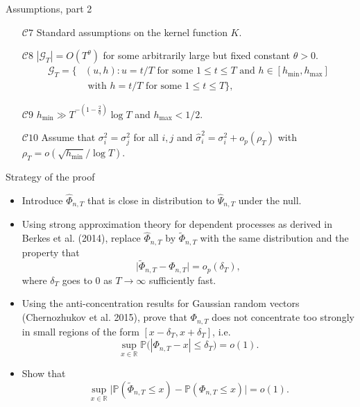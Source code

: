 \documentclass[10pt, handout]{beamer}
\newcommand{\pr}{\mathbb{P}}        %
\begin{document}
\begin{frame}{Assumptions, part 2}
\begin{itemize}
\item[$\mathcal{C}7$]\label{C-ker} Standard assumptions on the kernel function $K$. \pause
\item[$\mathcal{C}8$] \label{C-grid} $|\mathcal{G}_T| = O(T^\theta)$ for some arbitrarily large but fixed constant $\theta > 0$.\pause
\begin{align*}
\mathcal{G}_T = \big\{ & (u,h): u = t/T \text{ for some } 1 \le t \le T \text{ and } h \in [h_{\min},h_{\max}] \\ & \text{ with } h = t/T \text{ for some } 1 \le t \le T  \big\},
\end{align*}\pause
\vspace{-5mm}
\item[$\mathcal{C}9$] \label{C-h} $h_{\min} \gg T^{-(1-\frac{2}{q})} \log T$ and $h_{\max} <1/2$.\pause
\item[$\mathcal{C}10$] Assume that $\sigma_i^2 = \sigma_j^2$ for all $i, j$ and $\widehat{\sigma}_i^2 = \sigma_i^2 + o_p(\rho_T)$ with $\rho_T = o(\sqrt{h_{\min}}/\log T)$.
\end{itemize}
\end{frame}

\begin{frame}{Strategy of the proof}
\begin{itemize}
\item Introduce $\widehat{\Phi}_{n, T}$ that is close in distribution to $\widehat{\Psi}_{n, T}$ under the null.\pause
\item Using strong approximation theory for dependent processes as derived in Berkes et al. (2014), replace $\widehat{\Phi}_{n, T}$ by $\widetilde{\Phi}_{n, T}$ with the same distribution and the property that 
\begin{equation*}\label{eq-theo-stat-strategy-step1}
\big| \widetilde{\Phi}_{n, T} - \Phi_{n, T} \big| = o_p(\delta_T),
\end{equation*}
where $\delta_T$ goes to $0$ as $T\to\infty$ sufficiently fast.\pause
\item Using the anti-concentration results for Gaussian random vectors (Chernozhukov et al. 2015), prove that $\Phi_{n, T}$ does not concentrate too strongly in small regions of the form $[x-\delta_T,x+\delta_T]$, i.e.
\begin{equation*}\label{eq-theo-stat-strategy-step2}
\sup_{x \in \mathbb{R}} \pr \big( |\Phi_{n, T} - x| \le \delta_T \big) = o(1).
\end{equation*}\pause
\vspace{-2mm}
\item Show that 
\begin{equation*}\label{eq-theo-stat-strategy-claim}
\sup_{x \in \mathbb{R}} \big| \pr(\widetilde{\Phi}_{n, T} \le x) - \pr(\Phi_{n, T} \le x) \big| = o(1). 
\end{equation*}
\end{itemize}
\end{frame}
\end{document}
